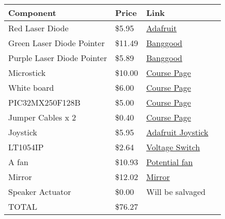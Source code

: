 \documentclass[10pt]{article}
\begin{document}
\begin{tabular}{llll}
\hline
Component & Price & Link & \\
\hline
Red Laser Diode & \$5.95 & \href{https://www.adafruit.com/products/1054}{Adafruit} & \\
Green Laser Diode Pointer & \$11.49 & \href{http://www.banggood.com/All-Star-532nm-Visible-laser-Diode-Green-Laser-Pointer-p-952441.html}{Banggood} & \\
Purple Laser Diode Pointer & \$5.89 & \href{http://www.banggood.com/Single-Purple-Laser-Pointer-Pen-With-2AAA-batteries-5mw-p-942425.html}{Banggood} & \\
Microstick & \$10.00 & \href{https://people.ece.cornell.edu/land/courses/ece4760/labs/f2016/lab5.html}{Course Page} & \\
White board & \$6.00 & \href{https://people.ece.cornell.edu/land/courses/ece4760/labs/f2016/lab5.html}{Course Page} & \\
PIC32MX250F128B & \$5.00 & \href{https://people.ece.cornell.edu/land/courses/ece4760/labs/f2016/lab5.html}{Course Page} & \\
Jumper Cables x 2 & \$0.40 & \href{https://people.ece.cornell.edu/land/courses/ece4760/labs/f2016/lab5.html}{Course Page} & \\
Joystick & \$5.95 & \href{https://www.adafruit.com/products/512}{Adafruit Joystick} & \\
LT1054IP & \$2.64 & \href{http://www.mouser.com/ProductDetail/Texas-Instruments/LT1054IP/?qs=paYhMW8qfitwFCC4i5I0HQ}{Voltage Switch} & \\
A fan & \$10.93 & \href{http://www.digikey.com/product-detail/en/EFB0612HHA/603-1026-ND/1014357?WT.mc_id=IQ_7595_G_pla1014357}{Potential fan} & \\
Mirror & \$12.02 & \href{http://www.onlinemetals.com/merchant.cfm?pid=7895&step=4&id=735&Cj0KEQjwvve_BRDmg9Kt9ufO15EBEiQAKoc6qk8IH2ER5s-AwA1TZpkKCJNiQJXJGtpEh3BDggOUHxoaApnE8P8HAQ}{Mirror} & \\
Speaker Actuator & \$0.00 & Will be salvaged & \\
TOTAL & \$76.27 &  & \\
\end{tabular}
\end{document}
